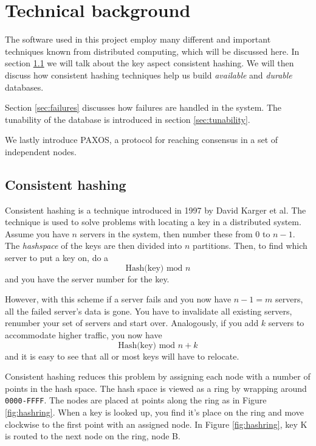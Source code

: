 
\section{Technical background}
\label{sec:technical_background}

The software used in this project employ many different and important techniques known from distributed computing, which will be discussed here.
In section \ref{sec:consistenthashing} we will talk about the key aspect consistent hashing.
We will then discuss how consistent hashing techniques help us build \emph{available} and \emph{durable} databases.

Section \ref{sec:failures} discusses how failures are handled in the system. The tunability of the database is introduced in section \ref{sec:tunability}.

We lastly introduce PAXOS, a protocol for reaching consensus in a set of independent nodes.

\subsection{Consistent hashing}
\label{sec:consistenthashing}
Consistent hashing is a technique introduced in 1997 by David Karger\cite{Karger97consistenthashing} et al.
The technique is used to solve problems with locating a key in a distributed system.
Assume you have $n$ servers in the system, then number these from $0$ to $n-1$.
The \emph{hashspace} of the keys are then divided into $n$ partitions. Then, to find which server to put a key on, do a $$\textrm{Hash(key) mod } n$$ and you have the server number for the key. 

However, with this scheme if a server fails and you now have $n-1=m$ servers, all the failed server's data is gone.
You have to invalidate all existing servers, renumber your set of servers and start over.
Analogously, if you add $k$ servers to accommodate higher traffic, you now have $$\textrm{Hash(key) mod } n + k$$ and it is easy to see that all or most keys will have to relocate.

Consistent hashing reduces this problem by assigning each node with a number of points in the hash space.
The hash space is viewed as a ring by wrapping around \texttt{0000-FFFF}. The nodes are placed at points along the ring as in Figure \ref{fig:hashring}. When a key is looked up, you find it's place on the ring and move clockwise to the first point with an assigned node. In Figure \ref{fig:hashring}, key K is routed to the next node on the ring, node B.

